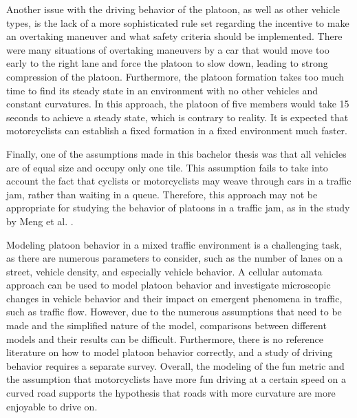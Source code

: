 Another issue with the driving behavior of the platoon, as well as other vehicle types, is the lack of a more sophisticated rule set regarding the incentive to make an overtaking maneuver and what safety criteria should be implemented. There were many situations of overtaking maneuvers by a car that would move too early to the right lane and force the platoon to slow down, leading to strong compression of the platoon. Furthermore, the platoon formation takes too much time to find its steady state in an environment with no other vehicles and constant curvatures. In this approach, the platoon of five members would take 15 seconds to achieve a steady state, which is contrary to reality. It is expected that motorcyclists can establish a fixed formation in a fixed environment much faster.

Finally, one of the assumptions made in this bachelor thesis was that all vehicles are of equal size and occupy only one tile. This assumption fails to take into account the fact that cyclists or motorcyclists may weave through cars in a traffic jam, rather than waiting in a queue. Therefore, this approach may not be appropriate for studying the behavior of platoons in a traffic jam, as in the study by Meng et al. \cite{MENG2007470}.

Modeling platoon behavior in a mixed traffic environment is a challenging task, as there are numerous parameters to consider, such as the number of lanes on a street, vehicle density, and especially vehicle behavior. A cellular automata approach can be used to model platoon behavior and investigate microscopic changes in vehicle behavior and their impact on emergent phenomena in traffic, such as traffic flow. However, due to the numerous assumptions that need to be made and the simplified nature of the model, comparisons between different models and their results can be difficult. Furthermore, there is no reference literature on how to model platoon behavior correctly, and a study of driving behavior requires a separate survey. Overall, the modeling of the fun metric and the assumption that motorcyclists have more fun driving at a certain speed on a curved road supports the hypothesis that roads with more curvature are more enjoyable to drive on.

